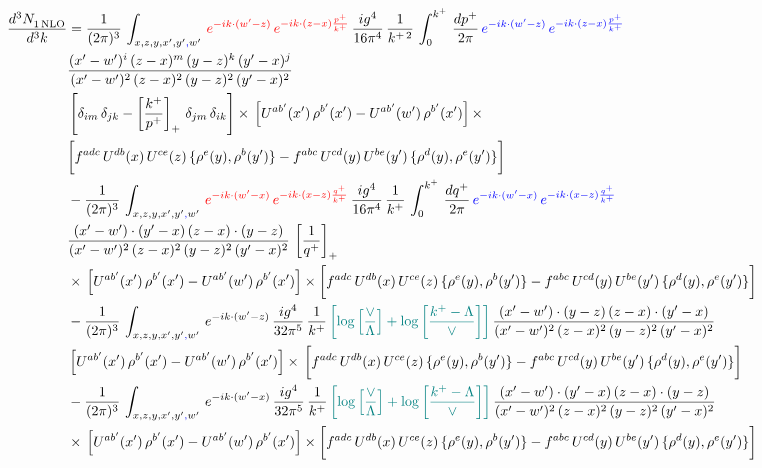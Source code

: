 \documentclass[9pt]{article}
\numberwithin{equation}{section}
\begin{document}
\begin{align}
     \frac{d^{3}N_{1\,\rm NLO}^{\rm}}{d^{3}k}  & = \frac{1}{(2\pi)^{3}}\, \int_{x,z,y,x',y'{\color{blue},}w'}\,{\color{red}e^{-ik\cdot (w^\prime-z)}\,e^{-ik\cdot (z-x)\frac{p^{+}}{k^{+}}}}\,\frac{ig^{4}}{16\pi^{4}}\, \frac{1}{k^{+\,2}}\,\int_{0}^{k^{+}}\, \frac{dp^{+}}{2\pi}\,{\color{blue}e^{-ik\cdot (w^\prime-z)}\,e^{-ik\cdot (z-x)\frac{p^{+}}{k^{+}}}}\notag \\ & \frac{(x'-w')^{i}\,(z-x)^{m}\,(y-z)^{k}\,(y'-x)^{j}}{(x'-w')^{2}\,(z-x)^{2}\,(y-z)^{2}\,(y'-x)^{2}}\,\notag \\ & \left[\delta_{im}\,\delta_{jk}-\left[\frac{k^{+}}{p^{+}}\right]_{+}\, \delta_{jm}\,\delta_{ik}\right]\times\, \left[U^{ab'}(x')\,\rho^{b'}(x')-U^{ab'}(w')\,\rho^{b'}(x')\right]\times\notag \\ & \bigg[f^{adc}\,U^{db}(x)\,U^{ce}(z)\, \{\rho^{e}(y),\rho^{b}(y')\}-f^{abc}\,U^{cd}(y)\,U^{be}(y')\, \{\rho^{d}(y),\rho^{e}(y')\}\bigg]\notag \\ & -\frac{1}{(2\pi)^{3}}\, \int_{x,z,y,x',y'{\color{blue},}w'}\,{\color{red}e^{-ik\cdot (w^\prime-x)}\,e^{-ik\cdot (x-z)\frac{q^{+}}{k^{+}}}}\,\frac{ig^{4}}{16\pi^{4}}\, \frac{1}{k^{+}}\,\int_{0}^{k^{+}}\, \frac{dq^{+}}{2\pi}\,{\color{blue}e^{-ik\cdot (w^\prime-x)}\,e^{-ik\cdot (x-z)\frac{q^{+}}{k^{+}}}}\notag \\ & \frac{(x'-w')\cdot (y'-x)\,(z-x)\cdot (y-z)}{(x'-w')^{2}\,(z-x)^{2}\,(y-z)^{2}\,(y'-x)^{2}}\,\left[\frac{1}{q^{+}}\right]_{+}\notag \\ & \times\, \left[U^{ab'}(x')\,\rho^{b'}(x')-U^{ab'}(w')\,\rho^{b'}(x')\right]\times \bigg[f^{adc}\,U^{db}(x)\,U^{ce}(z)\, \{\rho^{e}(y),\rho^{b}(y')\}-f^{abc}\,U^{cd}(y)\,U^{be}(y')\, \{\rho^{d}(y),\rho^{e}(y')\}\bigg]\notag \\ & -\frac{1}{(2\pi)^{3}}\, \int_{x,z,y,x',y'{\color{blue},}w'}\,e^{-ik\cdot (w^\prime-z)}\,\frac{ig^{4}}{32\pi^{5}}\, \frac{1}{k^{+}}\,{\color{teal}\left[\log{\left[\frac{\vee}{\Lambda}\right]} + \log{\left[\frac{k^{+}-\Lambda}{\vee}\right]}\right]}\,\frac{(x'-w')\cdot (y-z)\,(z-x)\cdot (y'-x)}{(x'-w')^{2}\,(z-x)^{2}\,(y-z)^{2}\,(y'-x)^{2}}\,\notag \\ & \left[U^{ab'}(x')\,\rho^{b'}(x')-U^{ab'}(w')\,\rho^{b'}(x')\right]\times\, \bigg[f^{adc}\,U^{db}(x)\,U^{ce}(z)\, \{\rho^{e}(y),\rho^{b}(y')\}-f^{abc}\,U^{cd}(y)\,U^{be}(y')\, \{\rho^{d}(y),\rho^{e}(y')\}\bigg]\notag \\ &  -\frac{1}{(2\pi)^{3}}\, \int_{x,z,y,x',y'{\color{blue},}w'}\,e^{-ik\cdot (w^\prime-x)}\,\frac{ig^{4}}{32\pi^{5}}\, \frac{1}{k^{+}}\,{\color{teal}\left[\log{\left[\frac{\vee}{\Lambda}\right]} + \log{\left[\frac{k^{+}-\Lambda}{\vee}\right]}\right]}\,\frac{(x'-w')\cdot (y'-x)\,(z-x)\cdot (y-z)}{(x'-w')^{2}\,(z-x)^{2}\,(y-z)^{2}\,(y'-x)^{2}}\notag \\ & \times\, \left[U^{ab'}(x')\,\rho^{b'}(x')-U^{ab'}(w')\,\rho^{b'}(x')\right]\times \bigg[f^{adc}\,U^{db}(x)\,U^{ce}(z)\, \{\rho^{e}(y),\rho^{b}(y')\}-f^{abc}\,U^{cd}(y)\,U^{be}(y')\, \{\rho^{d}(y),\rho^{e}(y')\}\bigg]
\end{align}
\end{document}
